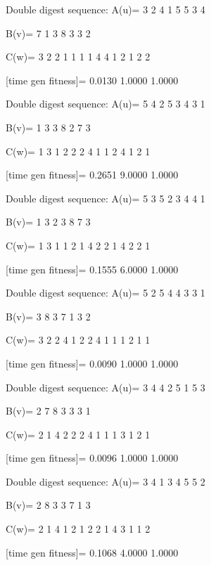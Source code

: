 Double digest sequence:
A(u)=
     3     2     4     1     5     5     3     4

B(v)=
     7     1     3     8     3     3     2

C(w)=
     3     2     2     1     1     1     1     4     4     1     2     1     2     2

[time gen fitness]=
    0.0130    1.0000    1.0000

Double digest sequence:
A(u)=
     5     4     2     5     3     4     3     1

B(v)=
     1     3     3     8     2     7     3

C(w)=
     1     3     1     2     2     2     4     1     1     2     4     1     2     1

[time gen fitness]=
    0.2651    9.0000    1.0000

Double digest sequence:
A(u)=
     5     3     5     2     3     4     4     1

B(v)=
     1     3     2     3     8     7     3

C(w)=
     1     3     1     1     2     1     4     2     2     1     4     2     2     1

[time gen fitness]=
    0.1555    6.0000    1.0000

Double digest sequence:
A(u)=
     5     2     5     4     4     3     3     1

B(v)=
     3     8     3     7     1     3     2

C(w)=
     3     2     2     4     1     2     2     4     1     1     1     2     1     1

[time gen fitness]=
    0.0090    1.0000    1.0000

Double digest sequence:
A(u)=
     3     4     4     2     5     1     5     3

B(v)=
     2     7     8     3     3     3     1

C(w)=
     2     1     4     2     2     2     4     1     1     1     3     1     2     1

[time gen fitness]=
    0.0096    1.0000    1.0000

Double digest sequence:
A(u)=
     3     4     1     3     4     5     5     2

B(v)=
     2     8     3     3     7     1     3

C(w)=
     2     1     4     1     2     1     2     2     1     4     3     1     1     2

[time gen fitness]=
    0.1068    4.0000    1.0000

